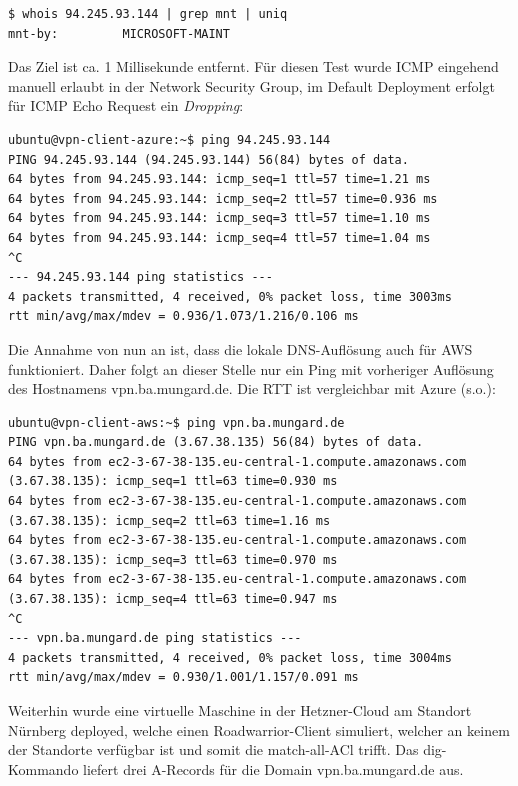 \begin{lstlisting}[label=whois-microsoft-ip,caption=.]
$ whois 94.245.93.144 | grep mnt | uniq
mnt-by:         MICROSOFT-MAINT
\end{lstlisting}

Das Ziel ist ca. 1 Millisekunde entfernt. Für diesen Test wurde ICMP eingehend manuell erlaubt in der Network Security Group, im Default Deployment erfolgt für ICMP Echo Request ein \textit{Dropping}:
\begin{lstlisting}[label=ping-microsoft-ip,caption=.]
ubuntu@vpn-client-azure:~$ ping 94.245.93.144
PING 94.245.93.144 (94.245.93.144) 56(84) bytes of data.
64 bytes from 94.245.93.144: icmp_seq=1 ttl=57 time=1.21 ms
64 bytes from 94.245.93.144: icmp_seq=2 ttl=57 time=0.936 ms
64 bytes from 94.245.93.144: icmp_seq=3 ttl=57 time=1.10 ms
64 bytes from 94.245.93.144: icmp_seq=4 ttl=57 time=1.04 ms
^C
--- 94.245.93.144 ping statistics ---
4 packets transmitted, 4 received, 0% packet loss, time 3003ms
rtt min/avg/max/mdev = 0.936/1.073/1.216/0.106 ms
\end{lstlisting}

Die Annahme von nun an ist, dass die lokale DNS-Auflösung auch für AWS funktioniert. Daher folgt an dieser Stelle nur ein Ping mit vorheriger Auflösung des Hostnamens vpn.ba.mungard.de. Die RTT ist vergleichbar mit Azure (s.o.):

\begin{lstlisting}[label=ping-aws-ip,caption=.]
ubuntu@vpn-client-aws:~$ ping vpn.ba.mungard.de
PING vpn.ba.mungard.de (3.67.38.135) 56(84) bytes of data.
64 bytes from ec2-3-67-38-135.eu-central-1.compute.amazonaws.com (3.67.38.135): icmp_seq=1 ttl=63 time=0.930 ms
64 bytes from ec2-3-67-38-135.eu-central-1.compute.amazonaws.com (3.67.38.135): icmp_seq=2 ttl=63 time=1.16 ms
64 bytes from ec2-3-67-38-135.eu-central-1.compute.amazonaws.com (3.67.38.135): icmp_seq=3 ttl=63 time=0.970 ms
64 bytes from ec2-3-67-38-135.eu-central-1.compute.amazonaws.com (3.67.38.135): icmp_seq=4 ttl=63 time=0.947 ms
^C
--- vpn.ba.mungard.de ping statistics ---
4 packets transmitted, 4 received, 0% packet loss, time 3004ms
rtt min/avg/max/mdev = 0.930/1.001/1.157/0.091 ms
\end{lstlisting}

Weiterhin wurde eine virtuelle Maschine in der Hetzner-Cloud am Standort Nürnberg deployed, welche einen Roadwarrior-Client simuliert, welcher an keinem der Standorte verfügbar ist und somit die \glqq match-all\grqq-ACl trifft. Das dig-Kommando liefert drei A-Records für die Domain vpn.ba.mungard.de aus.


